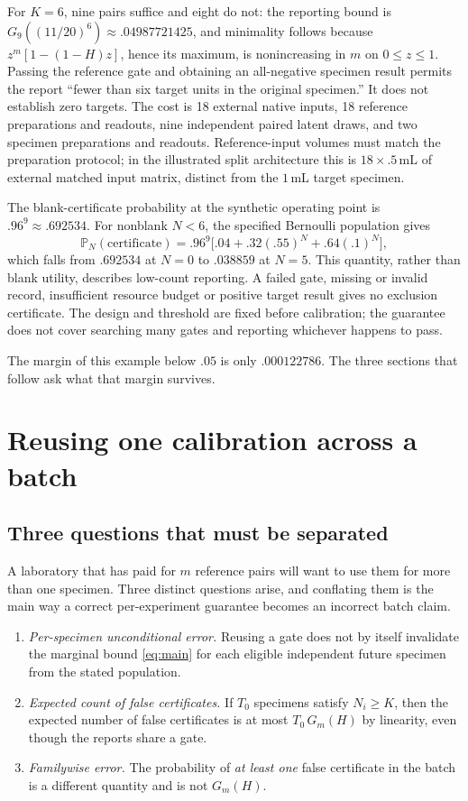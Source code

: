 \documentclass[11pt]{article}
\theoremstyle{remark}\newtheorem{remark}[theorem]{Remark}
\newcommand{\Prob}{\mathbb P}
\begin{document}
For $K=6$, nine pairs suffice and eight do not: the reporting bound is
$G_9((11/20)^6)\approx.04987721425$, and minimality follows because
$z^m[1-(1-H)z]$, hence its maximum, is nonincreasing in $m$ on $0\le z\le1$.
Passing the reference gate and obtaining an all-negative specimen result permits
the report ``fewer than six target units in the original specimen.'' It does not
establish zero targets. The cost is 18 external native inputs, 18 reference
preparations and readouts, nine independent paired latent draws, and two specimen
preparations and readouts. Reference-input volumes must match the preparation
protocol; in the illustrated split architecture this is $18\times.5\,\mathrm{mL}$
of external matched input matrix, distinct from the $1\,\mathrm{mL}$ target
specimen.

The blank-certificate probability at the synthetic operating point is
$.96^9\approx.692534$. For nonblank $N<6$, the specified Bernoulli population
gives
\begin{equation}\label{eq:nonblank}
\Prob_N(\text{certificate})=.96^9\big[.04+.32(.55)^N+.64(.1)^N\big],
\end{equation}
which falls from $.692534$ at $N=0$ to $.038859$ at $N=5$. This quantity, rather
than blank utility, describes low-count reporting. A failed gate, missing or
invalid record, insufficient resource budget or positive target result gives no
exclusion certificate. The design and threshold are fixed before calibration; the
guarantee does not cover searching many gates and reporting whichever happens to
pass.

The margin of this example below $.05$ is only $.000122786$. The three sections
that follow ask what that margin survives.

\section{Reusing one calibration across a batch}\label{sec:batch}
\subsection{Three questions that must be separated}
A laboratory that has paid for $m$ reference pairs will want to use them for more
than one specimen. Three distinct questions arise, and conflating them is the
main way a correct per-experiment guarantee becomes an incorrect batch claim.

\begin{enumerate}\itemsep2pt
\item \emph{Per-specimen unconditional error.} Reusing a gate does not by itself
  invalidate the marginal bound \eqref{eq:main} for each eligible independent
  future specimen from the stated population.
\item \emph{Expected count of false certificates.} If $T_0$ specimens satisfy
  $N_i\ge K$, then the expected number of false certificates is at most
  $T_0\,G_m(H)$ by linearity, even though the reports share a gate.
\item \emph{Familywise error.} The probability of \emph{at least one} false
  certificate in the batch is a different quantity and is not $G_m(H)$.
\end{enumerate}
\end{document}
